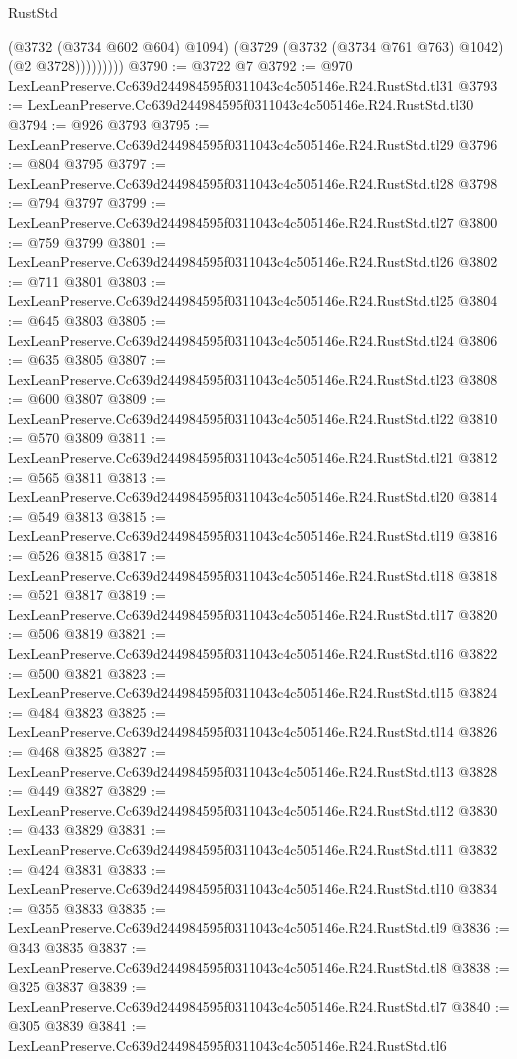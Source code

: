 \begin{lexlean}{RustStd}
\begin{coremodule}
                  (@3732 (@3734 @602 @604) @1094)
                  (@3729 (@3732 (@3734 @761 @763) @1042) (@2 @3728)))))))))
@3790 := @3722 @7
@3792 := @970 LexLeanPreserve.Cc639d244984595f0311043c4c505146e.R24.RustStd.tl31
@3793 := LexLeanPreserve.Cc639d244984595f0311043c4c505146e.R24.RustStd.tl30
@3794 := @926 @3793
@3795 := LexLeanPreserve.Cc639d244984595f0311043c4c505146e.R24.RustStd.tl29
@3796 := @804 @3795
@3797 := LexLeanPreserve.Cc639d244984595f0311043c4c505146e.R24.RustStd.tl28
@3798 := @794 @3797
@3799 := LexLeanPreserve.Cc639d244984595f0311043c4c505146e.R24.RustStd.tl27
@3800 := @759 @3799
@3801 := LexLeanPreserve.Cc639d244984595f0311043c4c505146e.R24.RustStd.tl26
@3802 := @711 @3801
@3803 := LexLeanPreserve.Cc639d244984595f0311043c4c505146e.R24.RustStd.tl25
@3804 := @645 @3803
@3805 := LexLeanPreserve.Cc639d244984595f0311043c4c505146e.R24.RustStd.tl24
@3806 := @635 @3805
@3807 := LexLeanPreserve.Cc639d244984595f0311043c4c505146e.R24.RustStd.tl23
@3808 := @600 @3807
@3809 := LexLeanPreserve.Cc639d244984595f0311043c4c505146e.R24.RustStd.tl22
@3810 := @570 @3809
@3811 := LexLeanPreserve.Cc639d244984595f0311043c4c505146e.R24.RustStd.tl21
@3812 := @565 @3811
@3813 := LexLeanPreserve.Cc639d244984595f0311043c4c505146e.R24.RustStd.tl20
@3814 := @549 @3813
@3815 := LexLeanPreserve.Cc639d244984595f0311043c4c505146e.R24.RustStd.tl19
@3816 := @526 @3815
@3817 := LexLeanPreserve.Cc639d244984595f0311043c4c505146e.R24.RustStd.tl18
@3818 := @521 @3817
@3819 := LexLeanPreserve.Cc639d244984595f0311043c4c505146e.R24.RustStd.tl17
@3820 := @506 @3819
@3821 := LexLeanPreserve.Cc639d244984595f0311043c4c505146e.R24.RustStd.tl16
@3822 := @500 @3821
@3823 := LexLeanPreserve.Cc639d244984595f0311043c4c505146e.R24.RustStd.tl15
@3824 := @484 @3823
@3825 := LexLeanPreserve.Cc639d244984595f0311043c4c505146e.R24.RustStd.tl14
@3826 := @468 @3825
@3827 := LexLeanPreserve.Cc639d244984595f0311043c4c505146e.R24.RustStd.tl13
@3828 := @449 @3827
@3829 := LexLeanPreserve.Cc639d244984595f0311043c4c505146e.R24.RustStd.tl12
@3830 := @433 @3829
@3831 := LexLeanPreserve.Cc639d244984595f0311043c4c505146e.R24.RustStd.tl11
@3832 := @424 @3831
@3833 := LexLeanPreserve.Cc639d244984595f0311043c4c505146e.R24.RustStd.tl10
@3834 := @355 @3833
@3835 := LexLeanPreserve.Cc639d244984595f0311043c4c505146e.R24.RustStd.tl9
@3836 := @343 @3835
@3837 := LexLeanPreserve.Cc639d244984595f0311043c4c505146e.R24.RustStd.tl8
@3838 := @325 @3837
@3839 := LexLeanPreserve.Cc639d244984595f0311043c4c505146e.R24.RustStd.tl7
@3840 := @305 @3839
@3841 := LexLeanPreserve.Cc639d244984595f0311043c4c505146e.R24.RustStd.tl6

\end{coremodule}
\end{lexlean}
